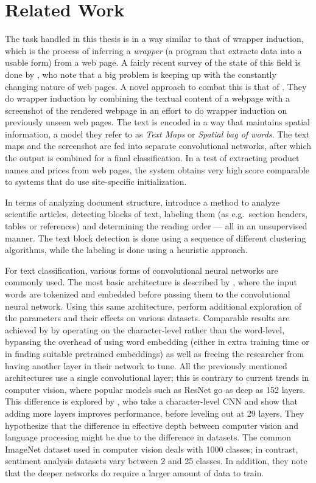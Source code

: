 \section{Related Work}
The task handled in this thesis is in a way similar to that of wrapper
induction, which is the process of inferring a \emph{wrapper} (a program that
extracts data into a usable form) from a web page. A fairly recent survey of the
state of this field is done by \textcite{wrapper}, who note that a big problem
is keeping up with the constantly changing nature of web pages.  A novel
approach to combat this is that of \textcite{deepweb}. They do wrapper induction
by combining the textual content of a webpage with a screenshot of the rendered
webpage in an effort to do wrapper induction on previously unseen web pages.
The text is encoded in a way that maintains spatial information, a model they
refer to as \emph{Text Maps} or \emph{Spatial bag of words}.  The text maps and
the screenshot are fed into separate convolutional networks, after which the
output is combined for a final classification. In a test of extracting product
names and prices from web pages, the system obtains very high score comparable
to systems that do use site-specific initialization.

In terms of analyzing document structure, \textcite{klampfl2014unsupervised}
introduce a method to analyze scientific articles, detecting blocks of text,
labeling them (as e.g.\ section headers, tables or references) and determining
the reading order --- all in an unsupervised manner. The text block detection is
done using a sequence of different clustering algorithms, while the labeling is
done using a heuristic approach.

For text classification, various forms of convolutional neural networks are
commonly used. The most basic architecture is described by
\textcite{kim2014conv}, where the input words are tokenized and embedded before
passing them to the convolutional neural network. Using this same architecture,
\textcite{zhang2015conv} perform additional exploration of the parameters and
their effects on various datasets. Comparable results are achieved by
\textcite{zhang2015character} by operating on the character-level rather than
the word-level, bypassing the overhead of using word embedding (either in extra
training time or in finding suitable pretrained embeddings) as well as freeing
the researcher from having another layer in their network to tune. All the
previously mentioned architectures use a single convolutional layer; this is
contrary to current trends in computer vision, where popular models such as
ResNet\citep{resnet2015} go as deep as 152 layers. This difference is explored
by \textcite{Conneau2016ldeep}, who take a character-level CNN and show that
adding more layers improves performance, before leveling out at 29 layers.  They
hypothesize that the difference in effective depth between computer vision and
language processing might be due to the difference in datasets. The common
ImageNet dataset used in computer vision deals with 1000 classes; in contrast,
sentiment analysis datasets vary between 2 and 25 classes. In addition, they
note that the deeper networks do require a larger amount of data to train.

